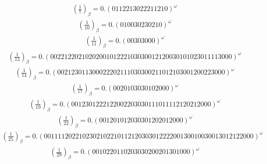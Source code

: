 \documentclass[fleqn]{article}
\begin{document}
\begin{equation*}
\begin{split}
(\frac{1}{7})_\beta = 0.(0112213022211210)^\omega
\end{split}\end{equation*}
\begin{equation*}
\begin{split}
(\frac{1}{10})_\beta = 0.(010030230210)^\omega
\end{split}\end{equation*}
\begin{equation*}
\begin{split}
(\frac{1}{11})_\beta = 0.(00303000)^\omega
\end{split}\end{equation*}
\begin{equation*}
\begin{split}
(\frac{1}{13})_\beta = 0.(0022122021020200101222103030012120030101023011113000)^\omega
\end{split}\end{equation*}
\begin{equation*}
\begin{split}
(\frac{1}{14})_\beta = 0.(002123011300022202111030300211012103001200223000)^\omega
\end{split}\end{equation*}
\begin{equation*}
\begin{split}
(\frac{1}{17})_\beta = 0.(0020103030102000)^\omega
\end{split}\end{equation*}
\begin{equation*}
\begin{split}
(\frac{1}{19})_\beta = 0.(0012301222122002203030111011112120212000)^\omega
\end{split}\end{equation*}
\begin{equation*}
\begin{split}
(\frac{1}{22})_\beta = 0.(001201012030301202012000)^\omega
\end{split}\end{equation*}
\begin{equation*}
\begin{split}
(\frac{1}{25})_\beta = 0.(001111202210230210221011212030301222200130010030013012122000)^\omega
\end{split}\end{equation*}
\begin{equation*}
\begin{split}
(\frac{1}{29})_\beta = 0.(0010220110203030200201301000)^\omega
\end{split}\end{equation*}
\end{document}
